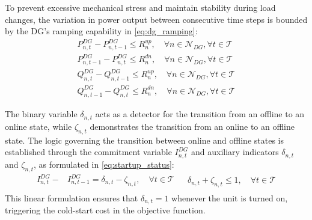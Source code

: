 \documentclass[preprint,12pt]{elsarticle}
\begin{document}
To prevent excessive mechanical stress and maintain stability during load changes, the variation in power output between consecutive time steps is bounded by the DG's ramping capability in \eqref{eq:dg_ramping}:
\begin{subequations}
\label{eq:dg_ramping}
\begin{align}
    P_{n,t}^{DG} - P_{n,t-1}^{DG} \le R_{n}^{up}, \quad \forall n \in \mathcal{N}_{DG}, \forall t \in \mathcal{T}
    \label{eq:ramp_p_up} \\
    P_{n,t-1}^{DG} - P_{n,t}^{DG} \le R_{n}^{dn}, \quad \forall n \in \mathcal{N}_{DG}, \forall t \in \mathcal{T}
    \label{eq:ramp_p_dn} \\
    Q_{n,t}^{DG} - Q_{n,t-1}^{DG} \le R_{n}^{up}, \quad \forall n \in \mathcal{N}_{DG}, \forall t \in \mathcal{T}
    \label{eq:ramp_q_up} \\
    Q_{n,t-1}^{DG} - Q_{n,t}^{DG} \le R_{n}^{dn}, \quad \forall n \in \mathcal{N}_{DG}, \forall t \in \mathcal{T} \label{eq:ramp_q_dn}
\end{align}
\end{subequations}

The binary variable $\delta_{n,t}$ acts as a detector for the transition from an offline to an online state, while $\zeta_{n,t}$ demonstrates the transition from an online to an offline state. The logic governing the transition between online and offline states is established through the commitment variable $I_{n,t}^{DG}$ and auxiliary indicators $\delta_{n,t}$ and $\zeta_{n,t}$, as formulated in \eqref{eq:startup_status}:
\begin{subequations}
\label{eq:startup_status}
    \begin{align}
    I_{n,t}^{DG} - &I_{n,t-1}^{DG} = \delta_{n,t} - \zeta_{n,t}, \quad \forall t \in \mathcal{T} \\
    \label{eq:statup}
    \end{align}
    \begin{align}
    &\delta_{n,t} + \zeta_{n,t} \le 1, \quad \forall t \in \mathcal{T}
    \label{eq:startup_init}
    \end{align}
\end{subequations}
This linear formulation ensures that $\delta_{n,t}=1$ whenever the unit is turned on, triggering the cold-start cost in the objective function. 
\end{document}
